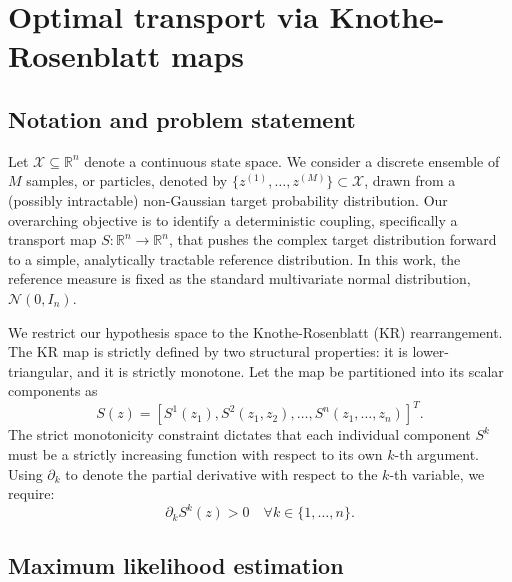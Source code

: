 \section{Optimal transport via Knothe-Rosenblatt maps}
\label{sec:core}


\subsection{Notation and problem statement}

Let $\mathcal{X} \subseteq \mathbb{R}^n$ denote a continuous state space. We consider a discrete ensemble of $M$ samples, or particles, denoted by $\{z^{(1)}, \dots, z^{(M)}\} \subset \mathcal{X}$, drawn from a (possibly intractable) non-Gaussian target probability distribution. Our overarching objective is to identify a deterministic coupling, specifically a transport map $S: \mathbb{R}^n \rightarrow \mathbb{R}^n$, that pushes the complex target distribution forward to a simple, analytically tractable reference distribution. In this work, the reference measure is fixed as the standard multivariate normal distribution, $\mathcal{N}(0, I_n)$.

We restrict our hypothesis space to the Knothe-Rosenblatt (KR) rearrangement. The KR map is strictly defined by two structural properties: it is lower-triangular, and it is strictly monotone. Let the map be partitioned into its scalar components as
\[S(z) = [S^1(z_1), S^2(z_1, z_2), \dots, S^n(z_1, \dots, z_n)]^T.\]
The strict monotonicity constraint dictates that each individual component $S^k$ must be a strictly increasing function with respect to its own $k$-th argument. Using $\partial_k$ to denote the partial derivative with respect to the $k$-th variable, we require:
\begin{equation}
    \partial_k S^k(z) > 0 \quad \forall k \in \{1, \dots, n\}.
    \label{eq:monotonicity_continuous}
\end{equation}

\subsection{Maximum likelihood estimation}

